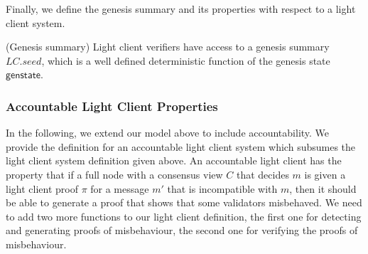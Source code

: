 \noindent Finally, we define the genesis summary and its properties with respect to a light client system. 

\begin{dfn}(Genesis summary) 
\label{def:genesis_summary} Light client verifiers have access to a genesis summary $\mathit{LC.seed}$, 
which is a well defined deterministic function of the genesis state $\mathsf{genstate}$.
\end{dfn}

\subsubsection{Accountable Light Client Properties}
\label{sec:accountability}

In the following, we extend our model above to include accountability. We provide the definition for an accountable light client system which subsumes the light client system definition given above.
An accountable light client has the property that if a full node with a consensus view $C$ that decides $m$ is given a light client proof $\pi$ for a message $m'$ that is incompatible with $m$, then it should be able to generate a proof that shows that some validators misbehaved. We need to add two more functions to our light client definition, the first one for detecting and generating proofs of misbehaviour, the second one for verifying the proofs of misbehaviour.

